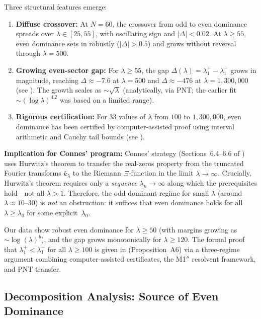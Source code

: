 \documentclass[12pt,a4paper]{article}
\theoremstyle{definition}
\theoremstyle{remark}
\begin{document}
Three structural features emerge:

\begin{enumerate}
  \item \textbf{Diffuse crossover:} At $N=60$, the crossover from odd to even dominance spreads over $\lambda \in [25, 55]$, with oscillating sign and $|\Delta| < 0.02$. At $\lambda \geq 55$, even dominance sets in robustly ($|\Delta| > 0.5$) and grows without reversal through $\lambda = 500$.

  \item \textbf{Growing even-sector gap:} For $\lambda \geq 55$, the gap $\Delta(\lambda) = \lambda_1^+ - \lambda_1^-$ grows in magnitude, reaching $\Delta \approx -7.6$ at $\lambda = 500$ and $\Delta \approx -476$ at $\lambda = 1{,}300{,}000$ (see ). The growth scales as $\sim\!\sqrt{\lambda}$ (analytically, via PNT; the earlier fit $\sim\!(\log\lambda)^{4.2}$ was based on a limited range).

  \item \textbf{Rigorous certification:} For $33$ values of $\lambda$ from $100$ to $1{,}300{,}000$, even dominance has been certified by computer-assisted proof using interval arithmetic and Cauchy tail bounds (see ).
\end{enumerate}

\textbf{Implication for Connes' program:} Connes' strategy (Sections~6.4--6.6 of \cite{Connes2025}) uses Hurwitz's theorem to transfer the real-zeros property from the truncated Fourier transforms $\hat{k}_\lambda$ to the Riemann $\Xi$-function in the limit $\lambda \to \infty$. Crucially, Hurwitz's theorem requires only a \emph{sequence} $\lambda_n \to \infty$ along which the prerequisites hold---not all $\lambda > 1$. Therefore, the odd-dominant regime for small $\lambda$ (around $\lambda \approx 10$--$30$) is \emph{not} an obstruction: it suffices that even dominance holds for all $\lambda \geq \lambda_0$ for some explicit~$\lambda_0$.

Our data show robust even dominance for $\lambda \geq 50$ (with margins growing as $\sim \log(\lambda)^b$), and the gap grows monotonically for $\lambda \geq 120$. The formal proof that $\lambda_1^+ < \lambda_1^-$ for all $\lambda \geq 100$ is given in  (Proposition~A6) via a three-regime argument combining computer-assisted certificates, the M1$''$ resolvent framework, and PNT transfer.

\subsection{Decomposition Analysis: Source of Even Dominance}
\end{document}
